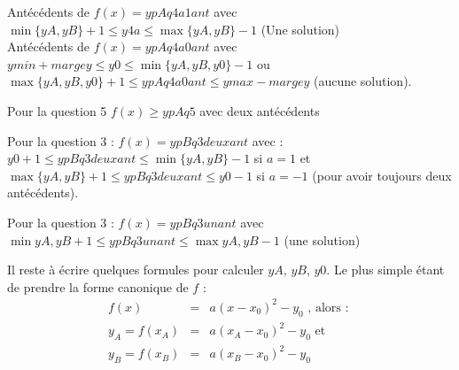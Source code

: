 {\begin{description}
          Antécédents de $f(x) =  ypAq4a1ant$ avec $\min\{yA,yB\}+1\leq y4a \leq \max\{yA,yB\}-1$ (Une solution)\\
          Antécédents de $f(x) = ypAq4a0ant$ avec $ymin+margey\leq y0 \leq \min\{yA,yB,y0\}-1$ ou 
           $ \max\{yA,yB,y0\}+1 \leq ypAq4a0ant \leq ymax-margey$ (aucune solution). 
\item[c inequation ] Pour la question 5 $f(x)\geq ypAq5$ avec deux antécédents  \\           
\item[Partie B]
\item[c10 a : ] Pour la question 3 : $f(x) = ypBq3deuxant$ avec :\\
    $y0+1 \leq ypBq3deuxant \leq \min\{yA,yB\}-1$ si $a=1$ et \\
          $  \max\{yA,yB\}+1\leq ypBq3deuxant \leq y0-1$ si $a=-1$ (pour avoir toujours deux antécédents).
\item[c10 b : ] Pour la question 3 : $f(x) = ypBq3unant$ avec $\min{yA,yB}+1\leq ypBq3unant\leq \max{yA,yB}-1$ (une solution)
 \end{description}
 
 Il reste à écrire quelques formules pour calculer $yA$, $yB$, $y0$. Le plus simple étant de prendre la forme canonique de $f$ :
 \begin{eqnarray*}
  f(x)&=& a (x-x_0)^2 - y_0 \mbox{ , alors : } \\
  y_A = f(x_A)&=& a(x_A-x_0)^2 - y_0 \mbox{ et }\\
  y_B =  f(x_B)&=& a(x_B-x_0)^2 - y_0
 \end{eqnarray*}

}
